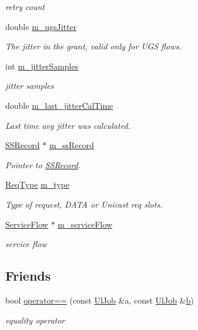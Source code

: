\begin{DoxyCompactItemize}
\begin{DoxyCompactList}\small\item\em retry count \end{DoxyCompactList}\item 
double \hyperlink{classns3_1_1UlJob_ad4f85db4984071728ecd3f2f4f4ac228}{m\+\_\+ugs\+Jitter}
\begin{DoxyCompactList}\small\item\em The jitter in the grant, valid only for U\+GS flows. \end{DoxyCompactList}\item 
int \hyperlink{classns3_1_1UlJob_a7fe33c932cd4e956479a53e9672016cb}{m\+\_\+jitter\+Samples}
\begin{DoxyCompactList}\small\item\em jitter samples \end{DoxyCompactList}\item 
double \hyperlink{classns3_1_1UlJob_af58ad6d3cf3dd156ec730e397b68d28c}{m\+\_\+last\+\_\+jitter\+Cal\+Time}
\begin{DoxyCompactList}\small\item\em Last time avg jitter was calculated. \end{DoxyCompactList}\item 
\hyperlink{classns3_1_1SSRecord}{S\+S\+Record} $\ast$ \hyperlink{classns3_1_1UlJob_a745230608fea13ba37e7201ef1d4671f}{m\+\_\+ss\+Record}
\begin{DoxyCompactList}\small\item\em Pointer to \hyperlink{classns3_1_1SSRecord}{S\+S\+Record}. \end{DoxyCompactList}\item 
\hyperlink{namespacens3_a534f9a14e4d9aeb5b400e61f152a73a2}{Req\+Type} \hyperlink{classns3_1_1UlJob_a57dafb3d0c72e0ef12e42e1e4fe5cb34}{m\+\_\+type}
\begin{DoxyCompactList}\small\item\em Type of request, D\+A\+TA or Unicast req slots. \end{DoxyCompactList}\item 
\hyperlink{classns3_1_1ServiceFlow}{Service\+Flow} $\ast$ \hyperlink{classns3_1_1UlJob_a38d65f8d1bcf722569fc792e1ba6bb13}{m\+\_\+service\+Flow}
\begin{DoxyCompactList}\small\item\em service flow \end{DoxyCompactList}\end{DoxyCompactItemize}
\subsection*{Friends}
\begin{DoxyCompactItemize}
\item 
bool \hyperlink{classns3_1_1UlJob_a6381ae0d5c6fdde0e3275709ce3c2fd3}{operator==} (const \hyperlink{classns3_1_1UlJob}{Ul\+Job} \&a, const \hyperlink{classns3_1_1UlJob}{Ul\+Job} \&\hyperlink{lte__pathloss_8m_a21ad0bd836b90d08f4cf640b4c298e7c}{b})
\begin{DoxyCompactList}\small\item\em equality operator \end{DoxyCompactList}\end{DoxyCompactItemize}

